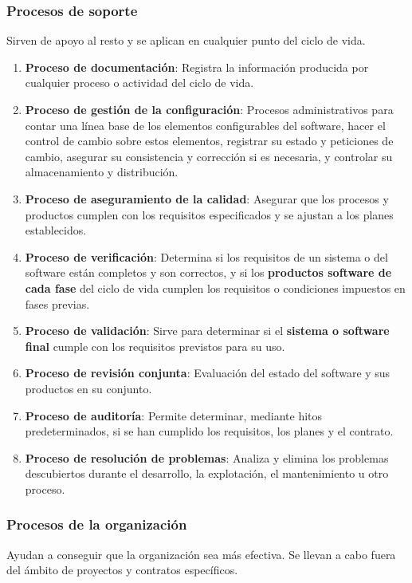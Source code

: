 \subsubsection{Procesos de soporte}
Sirven de apoyo al resto y se aplican en cualquier punto del ciclo de vida.
\begin{enumerate}
    \item \textbf{Proceso de documentación}: Registra la información producida por cualquier proceso o actividad del ciclo de vida.
    \item \textbf{Proceso de gestión de la configuración}: Procesos administrativos para contar una línea base de los elementos configurables del software, hacer el control de cambio sobre estos elementos, registrar su estado y peticiones de cambio, asegurar su consistencia y corrección si es necesaria, y controlar su almacenamiento y distribución.
    \item \textbf{Proceso de aseguramiento de la calidad}: Asegurar que los procesos y productos cumplen con los requisitos especificados y se ajustan a los planes establecidos.
    \item \textbf{Proceso de verificación}: Determina si los requisitos de un sistema o del software están completos y son correctos, y si los \textbf{productos software de cada fase} del ciclo de vida cumplen los requisitos o condiciones impuestos en fases previas.
    \item \textbf{Proceso de validación}: Sirve para determinar si el \textbf{sistema o software final} cumple con los requisitos previstos para su uso.
    \item \textbf{Proceso de revisión conjunta}: Evaluación del estado del software y sus productos en su conjunto.
    \item \textbf{Proceso de auditoría}: Permite determinar, mediante hitos predeterminados, si se han cumplido los requisitos, los planes y el contrato.
    \item \textbf{Proceso de resolución de problemas}: Analiza y elimina los problemas descubiertos durante el desarrollo, la explotación, el mantenimiento u otro proceso.
\end{enumerate}

\subsubsection{Procesos de la organización}
Ayudan a conseguir que la organización sea más efectiva. Se llevan a cabo fuera del ámbito de proyectos y contratos específicos.


